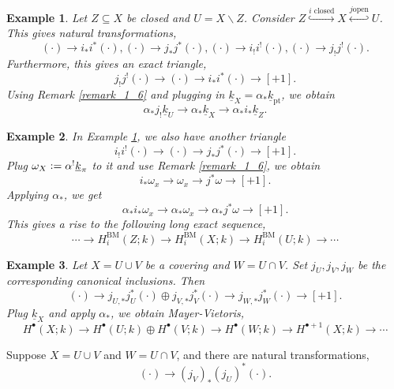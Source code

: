 \documentclass[8pt]{article}
\numberwithin{equation}{section}
\newtheorem{example}{Example}[section]
\newcommand{\defeq}{\vcentcolon=}
\newcommand{\ul}[1]{\underline{#1}}
\newcommand{\pt}[0]{\mathrm{pt}}
\begin{document}
\begin{example}
    Let $Z\subseteq X$ be closed and $U=X\backslash Z$. Consider $Z\stackrel{i \text{ closed}}{\hookrightarrow}X\stackrel{j \text{open}}{\hookleftarrow}U$. This gives natural transformations,
    \begin{equation*}
        (\cdot)\to i_*i^*(\cdot), (\cdot)\to j_*j^*(\cdot),(\cdot)\to i_!i^!(\cdot),(\cdot)\to j_!j^!(\cdot).
    \end{equation*} 
    Furthermore, this gives an exact triangle,
    \begin{equation*}
        j_!j^!(\cdot)\to (\cdot)\to i_*i^*(\cdot)\to[+1].
    \end{equation*}
    Using Remark \ref{remark_1_6} and plugging in $\ul{k}_X = \alpha_*\ul{k}_\pt$, we obtain
    \begin{equation*}
        \alpha_*j_!\ul{k}_U\to\alpha_*\ul{k}_X\to \alpha_*i_*\ul{k}_Z.
    \end{equation*}
    \label{example_2_1}
\end{example}

\begin{example}
    In Example \ref{example_2_1}, we also have another triangle
    \begin{equation*}
        i_!i^!(\cdot)\to (\cdot)\to j_*j^*(\cdot)\to[+1].
    \end{equation*}
    Plug $\omega_X\defeq \alpha^!\ul{k}_\pi$ to it and use Remark \ref{remark_1_6}, we obtain 
    \begin{equation*}
        i_*\omega_x\to \omega_x\to j^*\omega\to[+1].
    \end{equation*}
    Applying $\alpha_*$, we get
    \begin{equation*}
        \alpha_*i_*\omega_x\to \alpha_*\omega_x\to \alpha_*j^*\omega\to[+1].
    \end{equation*}
    This gives a rise to the following long exact sequence,
    \begin{equation*}
        \cdots\to H_i^{\mathrm{BM}}(Z;k)\to H_i^{\mathrm{BM}}(X;k)\to H_i^{\mathrm{BM}}(U;k)\to \cdots
    \end{equation*}
\end{example}

\begin{example}
    Let $X=U\cup V$ be a covering and $W=U\cap V$. Set $j_U,j_V,j_W$ be the corresponding canonical inclusions. Then 
    \begin{equation*}
        (\cdot)\to j_{U,*}j^*_U(\cdot)\oplus j_{V,*}j^*_V(\cdot)\to j_{W,*}j^*_W(\cdot)\to [+1].
    \end{equation*}
    Plug $\ul{k}_X$ and apply $\alpha_*$, we obtain Mayer-Vietoris,
    \begin{equation*}
        H^\bullet(X;k)\to H^\bullet(U;k)\oplus H^\bullet(V;k)\to H^\bullet(W;k)\to H^{\bullet+1}(X;k)\to\cdots
    \end{equation*}
\end{example}
Suppose $X=U\cup V$ and $W = U\cap V$, and there are natural transformations,
\begin{equation*}
    (\cdot)\to (j_V)_*(j_U)^*(\cdot).
\end{equation*}
\end{document}

